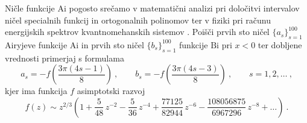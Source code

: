 \documentclass[slovene,11pt,a4paper]{article}
\newcommand{\Ai}{\mathrm{Ai}}
\newcommand{\Bi}{\mathrm{Bi}}
\begin{document}
Ničle funkcije $\Ai$ pogosto srečamo v matematični
analizi pri določitvi intervalov ničel specialnih funkcij
in ortogonalnih polinomov \cite{1_szego} ter v fiziki pri računu
energijskih spektrov kvantnomehanskih sistemov \cite{1_landauQM}.
Poišči prvih sto ničel $\{a_s\}_{s=1}^{100}$ Airyjeve
funkcije $\Ai$ in prvih sto ničel $\{b_s\}_{s=1}^{100}$
funkcije $\Bi$ pri $x<0$ ter dobljene vrednosti primerjaj s formulama
%
\begin{equation*}
  a_s = - f \left( \frac{3\pi(4s-1)}{8} \right) \>, \qquad
  b_s = - f \left( \frac{3\pi(4s-3)}{8} \right) \>, \qquad s = 1,2,\ldots \>,
\end{equation*}
%
kjer ima funkcija $f$ asimptotski razvoj \cite{1_abram}
%
\begin{equation*}
  f(z) \sim z^{2/3} \left(
  1 + \frac{5}{48} \, z^{-2}
  -\frac{5}{36} \, z^{-4}
  +\frac{77125}{82944} \, z^{-6}
  -\frac{108056875}{6967296} \, z^{-8} + \ldots\right) \>.
\end{equation*}




\end{document}
